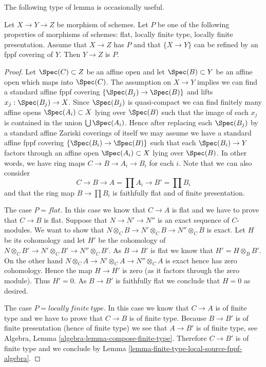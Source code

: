 \noindent
The following type of lemma is occasionally useful.

\begin{lemma}
\label{lemma-curiosity}
Let $X \to Y \to Z$ be morphism of schemes.
Let $P$ be one of the following properties of morphisms of schemes:
flat, locally finite type, locally finite presentation.
Assume that $X \to Z$ has $P$ and that $\{X \to Y\}$
can be refined by an fppf covering of $Y$. Then $Y \to Z$ is $P$.
\end{lemma}

\begin{proof}
Let $\Spec(C) \subset Z$ be an affine open and let
$\Spec(B) \subset Y$ be an affine open which maps into
$\Spec(C)$. The assumption on $X \to Y$ implies we can
find a standard affine fppf covering $\{\Spec(B_j) \to \Spec(B)\}$
and lifts $x_j : \Spec(B_j) \to X$. Since $\Spec(B_j)$
is quasi-compact we can find finitely many affine opens
$\Spec(A_i) \subset X$ lying over $\Spec(B)$
such that the image of each $x_j$
is contained in the union $\bigcup \Spec(A_i)$. Hence after
replacing each $\Spec(B_j)$ by a standard affine Zariski coverings
of itself we may assume we have a
standard affine fppf covering $\{\Spec(B_i) \to \Spec(B)\}$
such that each $\Spec(B_i) \to Y$ factors through an affine
open $\Spec(A_i) \subset X$ lying over $\Spec(B)$.
In other words, we have ring maps $C \to B \to A_i \to B_i$ for each $i$.
Note that we can also consider
$$
C \to B \to A = \prod A_i \to B' = \prod B_i
$$
and that the ring map $B \to \prod B_i$ is faithfully flat and
of finite presentation.

\medskip\noindent
The case $P = flat$. In this case we know that $C \to A$ is flat
and we have to prove that $C \to B$ is flat. Suppose that
$N \to N' \to N''$ is an exact sequence of $C$-modules. We want to
show that $N \otimes_C B \to N' \otimes_C B \to N'' \otimes_C B$
is exact. Let $H$ be its cohomology and let $H'$ be the cohomology
of $N \otimes_C B' \to N' \otimes_C B' \to N'' \otimes_C B'$. As
$B \to B'$ is flat we know that $H' = H \otimes_B B'$. On the other hand
$N \otimes_C A \to N' \otimes_C A \to N'' \otimes_C A$
is exact hence has zero cohomology. Hence the map
$H \to H'$ is zero (as it factors through the zero module).
Thus $H' = 0$. As $B \to B'$ is faithfully flat we conclude that
$H = 0$ as desired.

\medskip\noindent
The case $P = locally\ finite\ type$.
In this case we know that $C \to A$ is of finite type and
we have to prove that $C \to B$ is of finite type.
Because $B \to B'$ is of finite presentation (hence of finite type)
we see that $A \to B'$ is of finite type, see
Algebra, Lemma \ref{algebra-lemma-compose-finite-type}.
Therefore $C \to B'$ is of finite type and we conclude by
Lemma \ref{lemma-finite-type-local-source-fppf-algebra}.


\end{proof}
